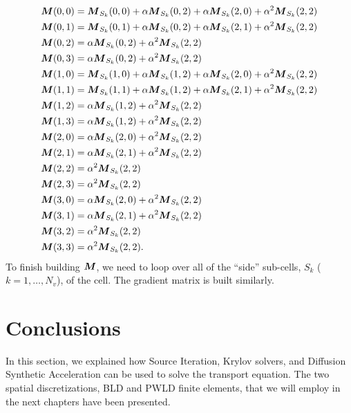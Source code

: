 {\allowdisplaybreaks
\begin{align}
  & \boldsymbol{M}(0,0) =  \boldsymbol{M}_{S_k}(0,0) + \alpha \boldsymbol{M}_{S_k}(0,2) + \alpha
  \boldsymbol{M}_{S_k}(2,0) + \alpha^2 \boldsymbol{M}_{S_k}(2,2)\\
  & \boldsymbol{M}(0,1) =  \boldsymbol{M}_{S_k}(0,1) + \alpha \boldsymbol{M}_{S_k}(0,2) + \alpha
  \boldsymbol{M}_{S_k}(2,1) + \alpha^2 \boldsymbol{M}_{S_k}(2,2)\\
  & \boldsymbol{M}(0,2) =  \alpha \boldsymbol{M}_{S_k}(0,2) + \alpha^2 \boldsymbol{M}_{S_k}(2,2)\\
  & \boldsymbol{M}(0,3) =  \alpha \boldsymbol{M}_{S_k}(0,2) + \alpha^2 \boldsymbol{M}_{S_k}(2,2)\\
  & \boldsymbol{M}(1,0) =  \boldsymbol{M}_{S_k}(1,0) + \alpha \boldsymbol{M}_{S_k}(1,2) + \alpha
  \boldsymbol{M}_{S_k}(2,0) + \alpha^2 \boldsymbol{M}_{S_k}(2,2)\\
  & \boldsymbol{M}(1,1) =  \boldsymbol{M}_{S_k}(1,1) + \alpha \boldsymbol{M}_{S_k}(1,2) + \alpha
  \boldsymbol{M}_{S_k}(2,1) + \alpha^2 \boldsymbol{M}_{S_k}(2,2)\\
  & \boldsymbol{M}(1,2) =  \alpha \boldsymbol{M}_{S_k}(1,2) + \alpha^2 \boldsymbol{M}_{S_k}(2,2)\\
  & \boldsymbol{M}(1,3) =  \alpha \boldsymbol{M}_{S_k}(1,2) + \alpha^2 \boldsymbol{M}_{S_k}(2,2)\\
  & \boldsymbol{M}(2,0) =  \alpha \boldsymbol{M}_{S_k}(2,0) + \alpha^2 \boldsymbol{M}_{S_k}(2,2)\\
  & \boldsymbol{M}(2,1) =  \alpha \boldsymbol{M}_{S_k}(2,1) + \alpha^2 \boldsymbol{M}_{S_k}(2,2)\\
  & \boldsymbol{M}(2,2) =  \alpha^2 \boldsymbol{M}_{S_k}(2,2)\\
  & \boldsymbol{M}(2,3) =  \alpha^2 \boldsymbol{M}_{S_k}(2,2)\\
  & \boldsymbol{M}(3,0) =  \alpha \boldsymbol{M}_{S_k}(2,0) + \alpha^2 \boldsymbol{M}_{S_k}(2,2)\\
  & \boldsymbol{M}(3,1) =  \alpha \boldsymbol{M}_{S_k}(2,1) + \alpha^2 \boldsymbol{M}_{S_k}(2,2)\\
  & \boldsymbol{M}(3,2) =  \alpha^2 \boldsymbol{M}_{S_k}(2,2)\\
  & \boldsymbol{M}(3,3) =  \alpha^2 \boldsymbol{M}_{S_k}(2,2). 
\end{align}}    
To finish building $\boldsymbol{M}$, we need to loop over all of the ``side''
sub-cells, $S_k$ ($k=1,\hdots,N_v$), of the cell. The gradient matrix is built 
similarly.

\section{Conclusions}
In this section, we explained how Source Iteration, Krylov solvers, and
Diffusion Synthetic Acceleration can be used to solve the transport equation. 
The two spatial discretizations, BLD and PWLD finite elements, that we will 
employ in the next chapters have been presented.

